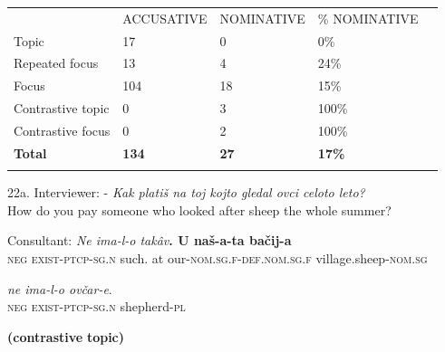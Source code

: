 \documentclass[output=paper]{langscibook}
\begin{document}
\begin{tabularx}{\textwidth}{XXXXX}

\lsptoprule
~ & ACCUSATIVE & NOMINATIVE & \% NOMINATIVE & \\
Topic & 17 & 0 & 0\% & \\
Repeated focus & 13 & 4 & 24\% & \\
Focus & 104 & 18 & 15\% & \\
Contrastive topic & 0 & 3 & 100\% & \\
Contrastive focus & 0 & 2 & 100\% & \\
\textbf{Total}  & \textbf{134} & \textbf{27} & \textbf{17\%} & \\
\lspbottomrule
\end{tabularx}
\begin{table}
\caption{Distribution of nominative and accusative forms with non-subject nouns for the three most conservative individual dialects. Raw numbers and \% of nominative}
\label{tab:key:5}
\end{table}

22a.  Interviewer: - \textit{Kak platiš na toj kojto gledal ovci celoto leto?}\\
    How do you pay someone who looked after sheep the whole summer? 

 Consultant:   \textit{Ne       ima-l-o                  takâv}\textbf{. \textbf{U}  \textbf{naš-a-ta}                                  \textbf{bačij-a}} \\
                                         \textsc{neg}      \textsc{exist-ptcp-sg.n}     such.  at our-\textsc{nom.sg.f-def.nom.sg.f}     village.sheep-\textsc{nom.sg}   

\textit{ne        ima-l-o                 ovčar-e}.                                            \\
\textsc{neg}       \textsc{exist-ptcp-sg.n}     shepherd-\textsc{pl}

                                                                                        \textbf{(contrastive} \textbf{topic)}
\end{document}
